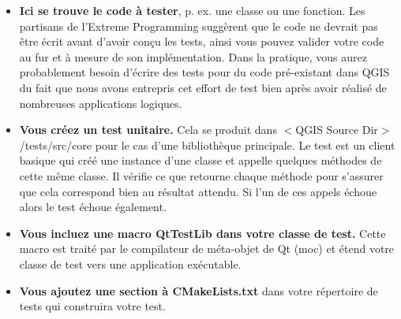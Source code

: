 \begin{itemize}
\item \textbf{Ici se trouve le code \`a tester}, p. ex. une classe ou une fonction. Les partisans de l'Extreme Programming sugg\`erent que le code ne devrait pas \^etre \'ecrit avant d'avoir con\c{c}u les tests, ainsi vous pouvez valider votre code au fur et  \`a mesure de son impl\'ementation. Dans la pratique, vous aurez probablement besoin d'\'ecrire des tests pour du code pr\'e-existant dans QGIS du fait que nous avons entrepris cet effort de test bien apr\`es avoir r\'ealis\'e de nombreuses applications logiques.

\item \textbf{Vous cr\'eez un test unitaire.} Cela se produit dans $<$QGIS Source Dir$>$/tests/src/core pour le cas d'une biblioth\`eque principale. Le test est un client basique qui cr\'e\'e une instance d'une classe et appelle quelques m\'ethodes de cette m\^eme classe. Il v\'erifie ce que retourne chaque m\'ethode pour s'assurer que cela correspond bien au r\'esultat attendu. Si l'un de ces appels \'echoue alors le test \'echoue \'egalement.

\item \textbf{Vous incluez une macro QtTestLib dans votre classe de test.} Cette macro est trait\'e par le compilateur de m\'eta-objet de Qt (moc) et \'etend votre classe de test vers une application ex\'ecutable.

% 
% 
% 
% 
\item \textbf{Vous ajoutez une section \`a CMakeLists.txt} dans votre r\'epertoire de tests qui construira votre test.


\end{itemize}
